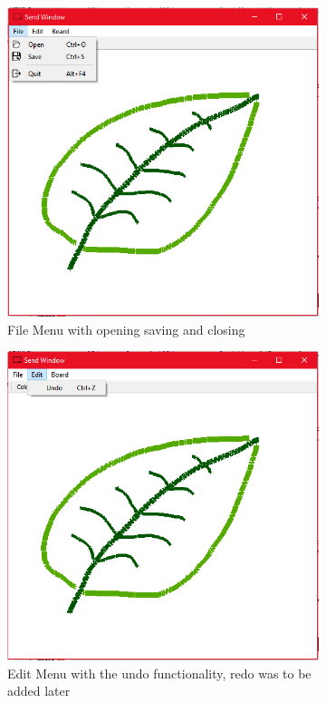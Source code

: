 \documentclass[10pt]{article}
\begin{document}
\begin{multicols*}{2}
\begin{figure}[H]
	\centering
	\begin{subfigure}[t]{0.32\columnwidth}

		\includegraphics[width=\columnwidth]{./file.png}
		\caption{File Menu with  opening saving and closing}
		\label{fig:file}
	\end{subfigure}
	\hfill
	\begin{subfigure}[t]{0.32\columnwidth}

		\includegraphics[width=\columnwidth]{./edit.png}
		\caption{Edit Menu with the undo functionality, redo was to be added later}
		\label{fig:edit}
	\end{subfigure}
	\hfill
	\begin{subfigure}[t]{0.32\columnwidth}


\end{subfigure}
\end{figure}
\end{multicols*}
\end{document}
